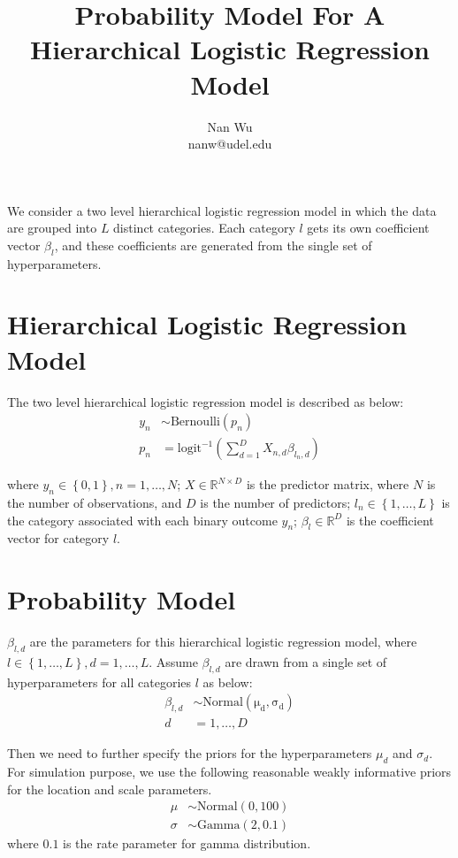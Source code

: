 \documentclass[12pt]{article}
\def\eqa{\left(\sum \limits_{d=1}^D X_{n,d}\beta_{l_n,d} \right)}
\begin{document}
\title{Probability Model For A Hierarchical Logistic Regression Model}
\author{Nan Wu \\ nanw@udel.edu}
\date{}
\maketitle

We consider a two level hierarchical logistic regression model in which the data are grouped into $L$ distinct categories. Each category $l$ gets its own coefficient vector $\beta_l$, and these coefficients are generated from the single set of hyperparameters.

\section{Hierarchical Logistic Regression Model}

The two level hierarchical logistic regression model is described as below:
\begin{align*}
  y_n &\sim \mathrm{Bernoulli}\left(p_n\right) \\
  p_n &= \mathrm{logit}^{-1}\eqa
\end{align*}

where $y_n \in \left \{0,1 \right\}, n=1,\ldots,N$; $X\in \mathbb{R}^{N \times D}$ is the predictor matrix, where $N$ is the number of observations, and $D$ is the number of predictors; $l_n\in \left\{1,\ldots,L \right\}$ is the category associated with each binary outcome $y_n$; $\beta_l \in \mathbb{R}^D$ is the coefficient vector for category $l$.

\section{Probability Model}

$\beta_{l,d}$ are the parameters for this hierarchical logistic regression model, where $l\in\left\{1,\ldots,L\right\}, d=1,\ldots,L$. Assume $\beta_{l,d}$ are drawn from a single set of hyperparameters for all categories $l$ as below:
\begin{align*}
  \beta_{l,d} &\sim \mathrm{Normal\left(\mu_d, \sigma_d \right)}\\
  d &= 1, \ldots, D
\end{align*}

Then we need to further specify the priors for the hyperparameters $\mu_d$ and $\sigma_d$. For simulation purpose, we use the following reasonable weakly informative priors for the location and scale parameters.
\begin{align*}
  \mu &\sim \mathrm{Normal}\left(0, 100 \right) \\
  \sigma &\sim \mathrm{Gamma}\left(2, 0.1\right)
\end{align*}
where $0.1$ is the rate parameter for gamma distribution.
\end{document}
